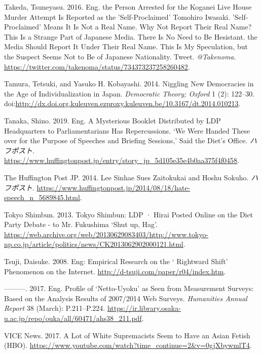 \documentclass[10pt,british,A4paper,,openany]{memoir}
\begin{document}
\hypertarget{ref-takeda_eng._2016}{}
Takeda, Tsuneyasu. 2016. Eng. the Person Arrested for the Koganei Live
House Murder Attempt Is Reported as the 'Self-Proclaimed' Tomohiro
Iwasaki. 'Self-Proclaimed' Means It Is Not a Real Name. Why Not Report
Their Real Name? This Is a Strange Part of Japanese Media. There Is No
Need to Be Hesistant. the Media Should Report It Under Their Real Name.
This Is My Speculation, but the Suspect Seems Not to Be of Japanese
Nationality. Tweet. \emph{@Takenoma}.
\url{https://twitter.com/takenoma/status/734373237258260482}.

\hypertarget{ref-tamura_niggling_2014}{}
Tamura, Tetsuki, and Yasuko H. Kobayashi. 2014. Niggling New Democracies
in the Age of Individualization in Japan. \emph{Democratic Theory;
Oxford} 1 (2): 122--30.
doi:\href{https://doi.org/http://dx.doi.org.kuleuven.ezproxy.kuleuven.be/10.3167/dt.2014.010213}{http://dx.doi.org.kuleuven.ezproxy.kuleuven.be/10.3167/dt.2014.010213}.

\hypertarget{ref-tanaka_eng._2019}{}
Tanaka, Shino. 2019. Eng. A Mysterious Booklet Distributed by LDP
Headquarters to Parliamentarians Has Repercussions. `We Were Handed
These over for the Purpose of Speeches and Briefing Sessions,' Said the
Diet's Office. \emph{ハフポスト}.
\url{https://www.huffingtonpost.jp/entry/story_jp_5d105e35e4b0aa375f4f0458}.

\hypertarget{ref-the_huffington_post_jp_lee_2014}{}
The Huffington Post JP. 2014. Lee Sinhae Sues Zaitokukai and Hoshu
Sokuho. \emph{ハフポスト}.
\url{https://www.huffingtonpost.jp/2014/08/18/hate-speech_n_5689845.html}.

\hypertarget{ref-tokyo_shimbun_tokyo_2013}{}
Tokyo Shimbun. 2013. Tokyo Shimbun: LDP · Hirai Posted Online on the
Diet Party Debate - to Mr. Fukushima `Shut up, Hag'.
\url{https://web.archive.org/web/20130629083403/http://www.tokyo-np.co.jp/article/politics/news/CK2013062902000121.html}.

\hypertarget{ref-tsuji_eng:_2008}{}
Tsuji, Daisuke. 2008. Eng: Empirical Research on the ` Rightward Shift'
Phenomenon on the Internet.
\url{http://d-tsuji.com/paper/r04/index.htm}.

\hypertarget{ref-tsuji_eng._2017}{}
---------. 2017. Eng. Profile of `Netto-Uyoku' as Seen from Measurement
Surveys: Based on the Analysis Results of 2007/2014 Web Surveys.
\emph{Humanities Annual Report} 38 (March): P.211--P.224.
\url{https://ir.library.osaka-u.ac.jp/repo/ouka/all/60471/ahs38_211.pdf}.

\hypertarget{ref-vice_news_lot_2017}{}
VICE News. 2017. A Lot of White Supremacists Seem to Have an Asian
Fetish (HBO).
\url{https://www.youtube.com/watch?time_continue=2\&v=0gjXbywmlT4}.
\end{document}
